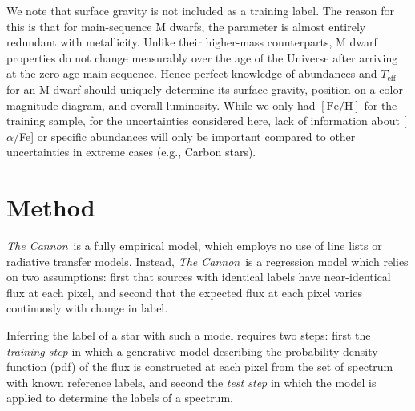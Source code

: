 \documentclass[modern]{aastex62}
\newcommand{\thecannon}{\textsl{The Cannon}}
\newcommand{\teff}{T_{\mathrm{eff}}}
\newcommand{\feh}{[{\mathrm{Fe}/\mathrm{H}}]}
\begin{document}
We note that surface gravity is not included as a training label. The reason for this is that for main-sequence M dwarfs, the parameter is almost entirely redundant with metallicity. Unlike their higher-mass counterparts, M dwarf properties do not change measurably over the age of the Universe after arriving at the zero-age main sequence. Hence perfect knowledge of abundances and $\teff$ for an M dwarf should uniquely determine its surface gravity, position on a color-magnitude diagram, and overall luminosity. While we only had $\feh$ for the training sample, for the uncertainties considered here, lack of information about [$\alpha$/Fe] or specific abundances will only be important compared to other uncertainties in extreme cases (e.g., Carbon stars). 



\section{Method}\label{sec:cannon}

\thecannon\ is a fully empirical model, which employs no use of line lists or radiative transfer models. Instead, \thecannon\ is a regression model which relies on two assumptions: first that sources with identical labels have near-identical flux at each pixel, and second that the expected flux at each pixel varies continuosly with change in label. 

Inferring the label of a star with such a model requires two steps: first the \emph{training step} in which a generative model describing the probability density function (pdf) of the flux is constructed at each pixel from the set of spectrum with known reference labels, and second the \emph{test step} in which the model is applied to determine the labels of a spectrum.
\end{document}
